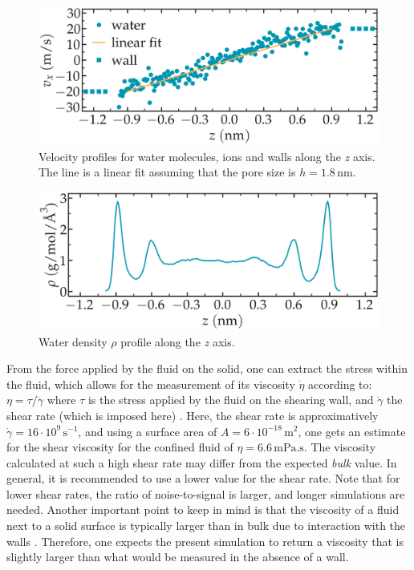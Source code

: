 \documentclass[9pt,tutorial]{livecoms}
\begin{document}
\begin{figure}
\centering
\includegraphics[width=\linewidth]{NANOSHEAR-velocity}
\caption{Velocity profiles for water molecules, ions and walls along the \textit{z} axis. The line is a linear fit assuming that the pore size is $h = 1.8\,\text{nm}$.}
\label{fig:NANOSHEAR-velocity}
\end{figure}

\begin{figure}
\centering
\includegraphics[width=\linewidth]{NANOSHEAR-density}
\caption{Water density $\rho$ profile along the \textit{z} axis.}
\label{fig:NANOSHEAR-density}
\end{figure}

From the force applied by the fluid on the solid, one can extract the stress within the fluid, which allows for the measurement of its viscosity $\dot{\eta}$ according to: $\eta = \tau / \dot{\gamma}$ where $\tau$ is the stress applied by the fluid on the shearing wall, and $\dot{\gamma}$ the shear rate (which is imposed here) \cite{gravelle2021violations}. Here, the shear rate is approximatively $\dot{\gamma} = 16 \cdot 10^9\,\text{s}^{-1}$, and using a surface area of $A = 6 \cdot 10^{-18}\,\text{m}^2$, one gets an estimate for the shear viscosity for the confined fluid of $\eta = 6.6\,\text{mPa.s}$. The viscosity calculated at such a high shear rate may differ from the expected \textit{bulk} value. In general, it is recommended to use a lower value for the shear rate. Note that for lower shear rates, the ratio of noise-to-signal is larger, and longer simulations are needed. Another important point to keep in mind is that the viscosity of a fluid next to a solid surface is typically larger than in bulk due to interaction with the walls \cite{wolde-kidanInterplayInterfacialViscosity2021}. Therefore, one expects the present simulation to return a viscosity that is slightly larger than what would be measured in the absence of a wall.
\end{document}
